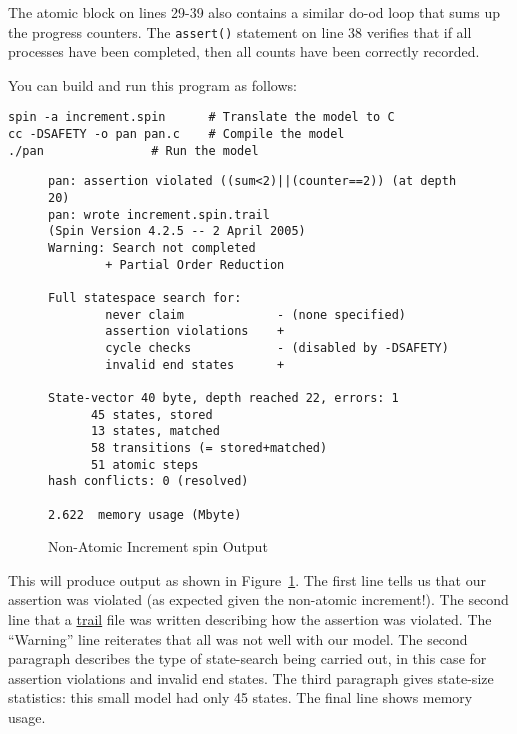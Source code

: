 The atomic block on lines 29-39 also contains a similar do-od
loop that sums up the progress counters.
The {\tt assert()} statement on line 38 verifies that if all processes
have been completed, then all counts have been correctly recorded.

You can build and run this program as follows:

\vspace{5pt}
\begin{minipage}[t]{\columnwidth}
\begin{verbatim}
spin -a increment.spin		# Translate the model to C
cc -DSAFETY -o pan pan.c	# Compile the model
./pan				# Run the model
\end{verbatim}
\end{minipage}
\vspace{5pt}

\begin{figure}[htbp]
{ \scriptsize
\begin{verbatim}
pan: assertion violated ((sum<2)||(counter==2)) (at depth 20)
pan: wrote increment.spin.trail
(Spin Version 4.2.5 -- 2 April 2005)
Warning: Search not completed
        + Partial Order Reduction

Full statespace search for:
        never claim             - (none specified)
        assertion violations    +
        cycle checks            - (disabled by -DSAFETY)
        invalid end states      +

State-vector 40 byte, depth reached 22, errors: 1
      45 states, stored
      13 states, matched
      58 transitions (= stored+matched)
      51 atomic steps
hash conflicts: 0 (resolved)

2.622  memory usage (Mbyte)
\end{verbatim}
}
\caption{Non-Atomic Increment spin Output}
\label{fig:analysis:Non-Atomic Increment spin Output}
\end{figure}

This will produce output as shown in
Figure~\ref{fig:analysis:Non-Atomic Increment spin Output}.
The first line tells us that our assertion was violated (as expected
given the non-atomic increment!).
The second line that a \url{trail} file was written describing how the
assertion was violated.
The ``Warning'' line reiterates that all was not well with our model.
The second paragraph describes the type of state-search being carried out,
in this case for assertion violations and invalid end states.
The third paragraph gives state-size statistics: this small model had only
45 states.
The final line shows memory usage.

